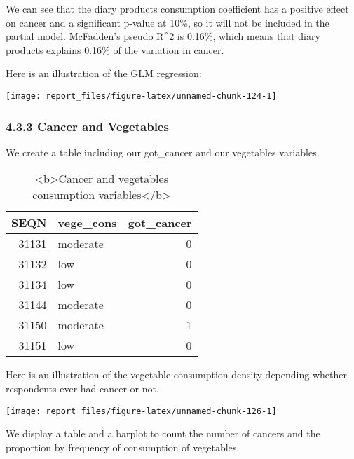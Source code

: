 \documentclass[
]{article}
\begin{document}
We can see that the diary products consumption coefficient has a
positive effect on cancer and a significant p-value at 10\%, so it will
not be included in the partial model. McFadden's pseudo R\^{}2 is
0.16\%, which means that diary products explains 0.16\% of the variation
in cancer.

Here is an illustration of the GLM regression:

\begin{center}\texttt{[image: report\_files/figure-latex/unnamed-chunk-124-1]} \end{center}

\hypertarget{cancer-and-vegetables}{%
\subsubsection{4.3.3 Cancer and
Vegetables}\label{cancer-and-vegetables}}

We create a table including our got\_cancer and our vegetables
variables.

\begin{table}

\caption{\label{tab:unnamed-chunk-125}<b>Cancer and vegetables consumption variables</b>}
\centering
\begin{tabular}[t]{r|l|r}
\hline
SEQN & vege\_cons & got\_cancer\\
\hline
31131 & moderate & 0\\
\hline
31132 & low & 0\\
\hline
31134 & low & 0\\
\hline
31144 & moderate & 0\\
\hline
31150 & moderate & 1\\
\hline
31151 & low & 0\\
\hline
\end{tabular}
\end{table}

Here is an illustration of the vegetable consumption density depending
whether respondents ever had cancer or not.

\begin{center}\texttt{[image: report\_files/figure-latex/unnamed-chunk-126-1]} \end{center}

We display a table and a barplot to count the number of cancers and the
proportion by frequency of consumption of vegetables.
\end{document}
